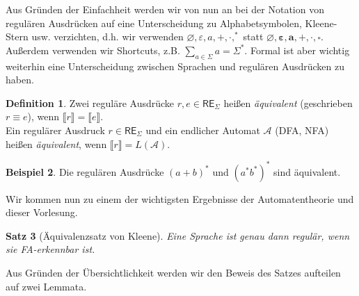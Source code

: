 \documentclass[11pt, a4paper]{article}
\theoremstyle{definition}
\newtheorem{definition}{Definition}[section]
\newtheorem{example}[definition]{Beispiel}
\theoremstyle{plain}
\newtheorem{theorem}[definition]{Satz}
\numberwithin{equation}{section}
\let\emptyset\varnothing
\begin{document}
Aus Gründen der Einfachheit werden wir von nun an bei der Notation von regulären Ausdrücken auf eine Unterscheidung zu Alphabetsymbolen, Kleene-Stern usw. verzichten, d.h. wir verwenden \( \emptyset, \varepsilon, a, +, \cdot, ^\ast \) statt \( \bm{\emptyset}, \bm{\varepsilon}, \bm{a}, \bm{+}, \bm{\cdot}, \overset{\bm{\ast}}{} \). Außerdem verwenden wir Shortcuts, z.B. \( \sum_{a\in\Sigma} a = \Sigma^\ast \). Formal ist aber wichtig weiterhin eine Unterscheidung zwischen Sprachen und regulären Ausdrücken zu haben.
\begin{definition}
	Zwei reguläre Ausdrücke \( r, e \in \mathsf{RE}_\Sigma \) heißen \textit{äquivalent} (geschrieben \( r \equiv e \)), wenn \( \llbracket r \rrbracket = \llbracket e \rrbracket \).\\
	Ein regulärer Ausdruck \( r \in \mathsf{RE}_\Sigma \) und ein endlicher Automat \( \mathcal{A} \) (DFA, NFA) heißen \textit{äquivalent}, wenn  \( \llbracket r \rrbracket = L(\mathcal{A}) \).
\end{definition}
\begin{example}
	Die regulären Ausdrücke \( (a + b)^\ast \) und \( (a^\ast b^\ast)^\ast \) sind äquivalent.
\end{example}
Wir kommen nun zu einem der wichtigsten Ergebnisse der Automatentheorie und dieser Vorlesung.
\begin{theorem}[Äquivalenzsatz von Kleene]\label{thm:kleene_equivalence}
	Eine Sprache ist genau dann regulär, wenn sie FA-erkennbar ist.
\end{theorem}
Aus Gründen der Übersichtlichkeit werden wir den Beweis des Satzes aufteilen auf zwei Lemmata.
\end{document}
